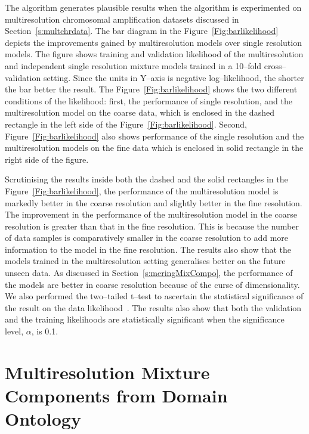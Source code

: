 The algorithm generates plausible results when the algorithm is 
experimented on multiresolution chromosomal amplification datasets 
discussed in Section~\ref{s:multchrdata}. The bar diagram in the 
Figure~\ref{Fig:barlikelihood} depicts the improvements gained by 
multiresolution models over single resolution models. The figure 
shows training and validation likelihood of the multiresolution 
and independent single resolution mixture models trained 
in a 10--fold cross--validation setting. Since the units in Y--axis 
is negative log--likelihood, the shorter the bar better the result. 
The Figure~\ref{Fig:barlikelihood} shows the two different conditions 
of the likelihood: first, the performance of single resolution, and 
the multiresolution model on the coarse data, which is enclosed in 
the dashed rectangle in the left side of the  Figure~\ref{Fig:barlikelihood}. 
Second, Figure~\ref{Fig:barlikelihood} 
also shows performance of the single resolution and the multiresolution 
models on the  fine data which is enclosed in solid rectangle in the 
right side of the figure.


Scrutinising the results inside both the dashed and the solid 
rectangles in the Figure~\ref{Fig:barlikelihood}, the performance 
of the multiresolution model is markedly better in  the coarse
resolution and slightly better in the fine resolution. The 
improvement in the performance of the multiresolution model in 
the coarse resolution is greater than that in the fine resolution. 
This is because the number of data samples is comparatively smaller 
in the coarse resolution to add more information to the model
in the fine resolution. The results also show that the models trained 
in the multiresolution setting generalises better on the future
unseen data. As discussed in Section~\ref{s:meringMixCompo},
the performance of the models are better in coarse resolution
because of the curse of dimensionality. We also performed the 
two--tailed t--test to ascertain the statistical significance 
of the result on the data likelihood~\cite{walpole2012}. 
The results also show that both the validation and the training 
likelihoods are statistically significant when the 
significance level, $\alpha$, is 0.1. 


\section[Multiresolution Mixture Components]
{Multiresolution Mixture Components from Domain Ontology}
\label{s:DomainOnto}

